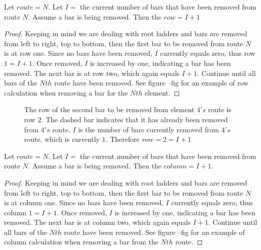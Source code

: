\begin{lemma}
  Let $route=N$. Let $I=$ the current number of bars that have been removed from route $N$. Assume a bar is being removed. 
  Then the $row=I+1$
\end{lemma}
\begin{proof}
  Keeping in mind we are dealing with root ladders and bars are removed from left to right, top to bottom, then the first bar to 
  be removed from route $N$ is at row one. Since no bars have been removed, $I$ currently equals zero, 
  thus row $1=I+1$. Once removed, $I$ is increased by one, indicating a bar has been removed. The next bar is at row two, 
  which again equals $I+1$. Continue until all bars of the $Nth$ route have been removed. See figure --fig for an example 
  of row calculation when removing a bar for the $Nth$ element.
\end{proof}
\begin{figure}[!htp]
  \begin{center}
  \end{center}
  \caption{The row of the second bar to be removed from element $4's$ route is row $2$. The dashed bar indicates that it has already been 
  removed from $4's$ route. $I$ is the number of bars currently removed from $4's$ route, which is currently $1$. Therefore $row=2=I+1$}
\end{figure}



\begin{lemma}
  Let $route=N$. Let $I=$ the current number of bars that have been removed from route $N$. Assume a bar is being removed.
  Then the $column=I+1$.
\end{lemma}
\begin{proof}
  Keeping in mind we are dealing with root ladders and bars are removed from left to right, top to bottom, then the first bar to 
  be removed from route $N$ is at column one. Since no bars have been removed, $I$ currently equals zero, 
  thus column $1=I+1$. Once removed, $I$ is increased by one, indicating a bar has been removed. The next bar is at column two, 
  which again equals $I+1$. Continue until all bars of the $Nth$ route have been removed. See figure --fig for an example 
  of column calculation when removing a bar from the $Nth$ route.
\end{proof}

